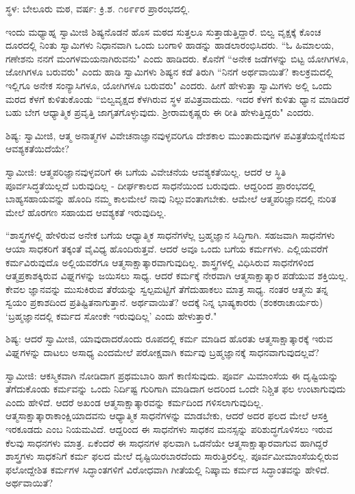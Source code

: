 \begin{center}
ಸ್ಥಳ: ಬೇಲೂರು ಮಠ, ವರ್ಷ: ಕ್ರಿ.ಶ. ೧೮೯೯ರ ಪ್ರಾರಂಭದಲ್ಲಿ.
\end{center}

ಇಂದು ಮಧ್ಯಾಹ್ನ ಸ್ವಾಮೀಜಿ ಶಿಷ್ಯನೊಡನೆ ಹೊಸ ಮಠದ ಸುತ್ತಲೂ ಸುತ್ತಾಡುತ್ತಿದ್ದಾರೆ. ಬಿಲ್ವ ವೃಕ್ಷಕ್ಕೆ ಕೊಂಚ ದೂರದಲ್ಲಿ ನಿಂತು ಸ್ವಾಮಿಗಳು ನಿಧಾನವಾಗಿ ಒಂದು ಬಂಗಾಳಿ ಹಾಡನ್ನು ಹಾಡಲಾರಂಭಿಸಿದರು. “ಓ ಹಿಮಾಲಯ, ಗಣೇಶನು ನನಗೆ ಮಂಗಳಮಯನಾಗಿರುವನು" ಎಂದು ಹಾಡಿದರು. ಕೊನೆಗೆ “ಅನೇಕ ಜಡೆಗಳನ್ನು ಬಿಟ್ಟ ಯೋಗಿಗಳೂ, ಜೋಗಿಗಳೂ ಬರುವರು" ಎಂದು ಹಾಡಿ ಸ್ವಾಮಿಗಳು ಶಿಷ್ಯನ ಕಡೆ ತಿರುಗಿ “ನಿನಗೆ ಅರ್ಥವಾಯಿತೆ? ಕಾಲಕ್ರಮದಲ್ಲಿ ಇಲ್ಲಿಗೂ ಅನೇಕ ಸಂನ್ಯಾಸಿಗಳೂ, ಯೋಗಿಗಳೂ ಬರುವರು" ಎಂದರು. ಹೀಗೆ ಹೇಳುತ್ತಾ ಸ್ವಾಮಿಗಳು ಅಲ್ಲಿ ಒಂದು ಮರದ ಕೆಳಗೆ ಕುಳಿತುಕೊಂಡು “ಬಿಲ್ವವೃಕ್ಷದ ಕೆಳಗಿರುವ ಸ್ಥಳ ಪವಿತ್ರವಾದುದು. ಇದರ ಕೆಳಗೆ ಕುಳಿತು ಧ್ಯಾನ ಮಾಡಿದರೆ ಬಹು ಬೇಗ ಆಧ್ಯಾತ್ಮಿಕ ಪ್ರವೃತ್ತಿ ಜಾಗೃತಗೊಳ್ಳುವುದು. ಶ‍್ರೀರಾಮಕೃಷ್ಣರು ಈ ರೀತಿ ಹೇಳುತ್ತಿದ್ದರು" ಎಂದರು.

ಶಿಷ್ಯ: ಸ್ವಾಮೀಜಿ, ಆತ್ಮ ಅನಾತ್ಮಗಳ ವಿವೇಚನಾಜ್ಞಾನವುಳ್ಳವರಿಗೂ ದೇಶಕಾಲ ಮುಂತಾದುವುಗಳ ಪವಿತ್ರತೆಯನ್ನೆಣಿಸುವ ಆವಶ್ಯಕತೆಯಿದೆಯೇ?

ಸ್ವಾಮೀಜಿ: ಆತ್ಮಪರಿಜ್ಞಾನವುಳ್ಳವರಿಗೆ ಈ ಬಗೆಯ ವಿವೇಚನೆಯ ಆವಶ್ಯಕತೆಯಿಲ್ಲ. ಆದರೆ ಆ ಸ್ಥಿತಿ ಪೂರ್ವಸಿದ್ಧತೆಯಿಲ್ಲದೆ ಬರುವುದಿಲ್ಲ - ದೀರ್ಘಕಾಲದ ಸಾಧನೆಯಿಂದ ಬರುವುದು. ಆದ್ದರಿಂದ ಪ್ರಾರಂಭದಲ್ಲಿ ಬಾಹ್ಯಸಹಾಯವನ್ನು ಹೊಂದಿ ನಮ್ಮ ಕಾಲಮೇಲೆ ನಾವು ನಿಲ್ಲುವಂತಾಗಬೇಕು. ಆಮೇಲೆ ಆತ್ಮಪರಿಜ್ಞಾನದಲ್ಲಿ ನುರಿತ ಮೇಲೆ ಹೊರಗಣ ಸಹಾಯದ ಆವಶ್ಯಕತೆ ಇರುವುದಿಲ್ಲ.

“ಶಾಸ್ತ್ರಗಳಲ್ಲಿ ಹೇಳಿರುವ ಅನೇಕ ಬಗೆಯ ಆಧ್ಯಾತ್ಮಿಕ ಸಾಧನೆಗಳೆಲ್ಲ ಬ್ರಹ್ಮಜ್ಞಾನ ಸಿದ್ಧಿಗಾಗಿ. ಸಹಜವಾಗಿ ಸಾಧನೆಗಳು ಆಯಾ ಸಾಧಕರಿಗೆ ತಕ್ಕಂತೆ ವೈವಿಧ್ಯ ಹೊಂದಿರುತ್ತವೆ. ಆದರೆ ಅವೂ ಒಂದು ಬಗೆಯ ಕರ್ಮಗಳು. ಎಲ್ಲಿಯವರೆಗೆ ಕರ್ಮವಿರುವುದೊ ಅಲ್ಲಿಯವರೆಗೂ ಆತ್ಮಸಾಕ್ಷಾತ್ಕಾರವಾಗುವುದಿಲ್ಲ. ಶಾಸ್ತ್ರಗಳಲ್ಲಿ ವಿಧಿಸಿರುವ ಸಾಧನೆಗಳಿಂದ ಆತ್ಮಪ್ರಕಾಶಕ್ಕಿರುವ ವಿಘ್ನಗಳನ್ನು ಜಯಿಸಲು ಸಾಧ್ಯ. ಆದರೆ ಕರ್ಮಕ್ಕೆ ನೇರವಾಗಿ ಆತ್ಮಸಾಕ್ಷಾತ್ಕಾರ ಪಡೆಯುವ ಶಕ್ತಿಯಿಲ್ಲ. ಕೇವಲ ಜ್ಞಾನವನ್ನು ಮುಸುಕಿರುವ ತೆರೆಯನ್ನು ಸ್ವಲ್ಪಮಟ್ಟಿಗೆ ತೆಗೆದುಹಾಕಲು ಮಾತ್ರ ಸಾಧ್ಯ. ನಂತರ ಆತ್ಮನು ತನ್ನ ಸ್ವಯಂ ಪ್ರಕಾಶದಿಂದ ಪ್ರತಿಷ್ಟಿತನಾಗುತ್ತಾನೆ. ಅರ್ಥವಾಯಿತೆ? ಅದಕ್ಕೆ ನಿನ್ನ ಭಾಷ್ಯಕಾರರು (ಶಂಕರಾಚಾರ್ಯರು) ‘ಬ್ರಹ್ಮಜ್ಞಾನದಲ್ಲಿ ಕರ್ಮದ ಸೋಂಕೇ ಇರುವುದಿಲ್ಲ’ ಎಂದು ಹೇಳುತ್ತಾರೆ."

ಶಿಷ್ಯ: ಆದರೆ ಸ್ವಾಮೀಜಿ, ಯಾವುದಾದರೊಂದು ರೂಪದಲ್ಲಿ ಕರ್ಮ ಮಾಡಿದ ಹೊರತು ಆತ್ಮಸಾಕ್ಷಾತ್ಕಾರಕ್ಕೆ ಇರುವ ವಿಘ್ನಗಳನ್ನು ದಾಟಲು ಅಸಾಧ್ಯ ಎಂದಮೇಲೆ ಪರೋಕ್ಷವಾಗಿ ಕರ್ಮವು ಬ್ರಹ್ಮಜ್ಞಾನಕ್ಕೆ ಸಾಧನವಾಗುವುದಲ್ಲವೆ?

ಸ್ವಾಮೀಜಿ: ಆಕಸ್ಮಿಕವಾಗಿ ನೋಡಿದಾಗ ಪ್ರಥಮಬಾರಿ ಹಾಗೆ ಕಾಣಿಸುವುದು. ಪೂರ್ವ ಮಿಮಾಂಸೆಯ ಈ ದೃಷ್ಟಿಯನ್ನು ತೆಗೆದುಕೊಂಡು ಕರ್ಮವನ್ನು ಒಂದು ನಿರ್ದಿಷ್ಟ ಗುರಿಗಾಗಿ ಮಾಡಿದಾಗ ಅದರಿಂದ ಒಂದೇ ನಿಶ್ಚಿತ ಫಲ ಉಂಟಾಗುವುದು ಎಂದು ಹೇಳಿದೆ. ಆದರೆ ಅಖಂಡ ಆತ್ಮಸಾಕ್ಷಾತ್ಕಾರವನ್ನು ಕರ್ಮದಿಂದ ಗಳಿಸಲಾಗುವುದಿಲ್ಲ. ಆತ್ಮಸಾಕ್ಷಾತ್ಕಾರಾಕಾಂಕ್ಷಿಯಾದವನು ಆಧ್ಯಾತ್ಮಿಕ ಸಾಧನೆಗಳನ್ನು ಮಾಡಬೇಕು, ಆದರೆ ಅದರ ಫಲದ ಮೇಲೆ ಆಸಕ್ತಿ ಇರಕೂಡದು ಎಂಬ ನಿಯಮವಿದೆ. ಆದ್ದರಿಂದ ಈ ಸಾಧನೆಗಳು ಸಾಧಕನ ಮನಸ್ಸನ್ನು ಪರಿಶುದ್ಧಗೊಳಿಸಲು ಇರುವ ಕೆಲವು ಸಾಧನಗಳು ಮಾತ್ರ. ಏಕೆಂದರೆ ಈ ಸಾಧನಗಳ ಫಲವಾಗಿ ಒಡನೆಯೇ ಆತ್ಮಸಾಕ್ಷಾತ್ಕಾರವಾಗುವ ಹಾಗಿದ್ದರೆ ಶಾಸ್ತ್ರಗಳು ಸಾಧಕನಿಗೆ ಕರ್ಮ ಫಲದ ಮೇಲೆ ದೃಷ್ಟಿಯಿರಬಾರದೆಂದು ಸಾರುತ್ತಿರಲಿಲ್ಲ. ಪೂರ್ವಮೀಮಾಂಸೆಯಲ್ಲಿರುವ ಫಲೋದ್ದೇಶಿತ ಕರ್ಮಗಳ ಸಿದ್ಧಾಂತಗಳಿಗೆ ವಿರೋಧವಾಗಿ ಗೀತೆಯಲ್ಲಿ ನಿಷ್ಕಾಮ ಕರ್ಮದ ಸಿದ್ಧಾಂತವನ್ನು ಹೇಳಿದೆ. ಅರ್ಥವಾಯಿತೆ?

